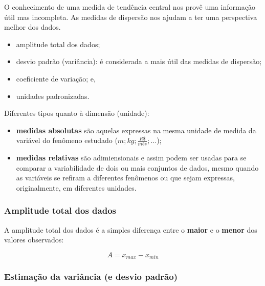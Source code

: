 \documentclass[
]{book}
\providecommand{\tightlist}{%
  \setlength{\itemsep}{0pt}\setlength{\parskip}{0pt}}
\begin{document}
\hfill\break

O conhecimento de uma medida de tendência central nos provê uma informação útil mas incompleta. As medidas de dispersão nos ajudam a ter uma perspectiva melhor dos dados.

\hfill\break

\begin{itemize}
\tightlist
\item
  amplitude total dos dados;
\item
  desvio padrão (variância): é considerada a mais útil das medidas de dispersão;\\
\item
  coeficiente de variação; e,
\item
  unidades padronizadas.
\end{itemize}

\hfill\break

Diferentes tipos quanto à dimensão (unidade):

\hfill\break

\begin{itemize}
\tightlist
\item
  \textbf{medidas absolutas} são aquelas expressas na mesma unidade de medida da variável do fenômeno estudado (\(m;kg;\frac{R\$}{mês};\dots\));\\
\item
  \textbf{medidas relativas} são adimiensionais e assim podem ser usadas para se comparar a variabilidade de dois ou mais conjuntos de dados, mesmo quando as variáveis se refiram a diferentes fenômenos ou que sejam expressas, originalmente, em diferentes unidades.
\end{itemize}

\hfill\break

\hypertarget{amplitude-total-dos-dados}{%
\subsubsection{Amplitude total dos dados}\label{amplitude-total-dos-dados}}

\hfill\break

A amplitude total dos dados é a simples diferença entre o \textbf{maior} e o \textbf{menor} dos valores observados:

\hfill\break

\[
A=x_{max} - x_{min}
\]

\hfill\break

\hypertarget{estimauxe7uxe3o-da-variuxe2ncia-e-desvio-padruxe3o}{%
\subsubsection{Estimação da variância (e desvio padrão)}\label{estimauxe7uxe3o-da-variuxe2ncia-e-desvio-padruxe3o}}
\end{document}
